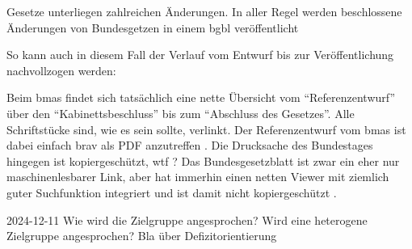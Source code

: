 Gesetze unterliegen zahlreichen Änderungen. In aller Regel werden beschlossene Änderungen von Bundesgetzen in einem \gls{bgbl} veröffentlicht  


So kann auch in diesem Fall der Verlauf vom Entwurf bis zur Veröffentlichung nachvollzogen werden:

Beim \gls{bmas} findet sich tatsächlich eine nette Übersicht vom \enquote{Referenzentwurf} über den \enquote{Kabinettsbeschluss} bis zum \enquote{Abschluss des Gesetzes}.
Alle Schriftstücke sind, wie es sein sollte, verlinkt. Der Referenzentwurf vom \gls{bmas} ist dabei einfach brav als PDF anzutreffen \autocite{BMAS-21.07.2020}. 
Die Drucksache des Bundestages hingegen ist kopiergeschützt, wtf \autocite{Bundestag.31.08.2020}?
Das Bundesgesetzblatt ist zwar ein eher nur maschinenlesbarer Link, aber hat immerhin einen netten Viewer mit ziemlich guter Suchfunktion integriert und ist damit nicht kopiergeschützt \autocite{BGBl.2020-I-Nr67}. 



2024-12-11
Wie wird die Zielgruppe angesprochen?
Wird eine heterogene Zielgruppe angesprochen?
Bla über Defizitorientierung


